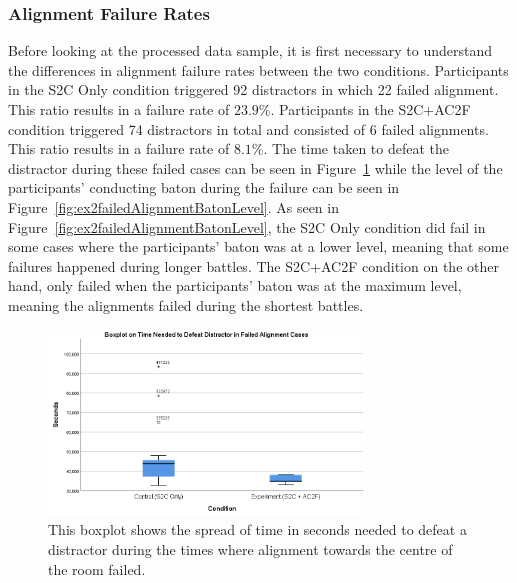 \subsubsection{Alignment Failure Rates}
Before looking at the processed data sample, it is first necessary to understand the differences in alignment failure rates between the two conditions. Participants in the S2C Only condition triggered 92 distractors in which 22 failed alignment. This ratio results in a failure rate of $23.9\%$. Participants in the S2C+AC2F condition triggered 74 distractors in total and consisted of 6 failed alignments. This ratio results in a failure rate of $8.1\%$. The time taken to defeat the distractor during these failed cases can be seen in Figure~\ref{fig:ex2failedDistractorTimeBoxplot} while the level of the participants' conducting baton during the failure can be seen in Figure~\ref{fig:ex2failedAlignmentBatonLevel}. As seen in Figure~\ref{fig:ex2failedAlignmentBatonLevel}, the S2C Only condition did fail in some cases where the participants' baton was at a lower level, meaning that some failures happened during longer battles. The S2C+AC2F condition on the other hand, only failed when the participants' baton was at the maximum level, meaning the alignments failed during the shortest battles. 

\begin{figure}[tbph]
    \centering
    \includegraphics[width=0.75\textwidth]{figures/graphs/failureDistractorDefeatTimeBoxplot.png}
    \caption[Boxplot of Time Needed to Defeat Distractor During Failed Alignments]{This boxplot shows the spread of time in seconds needed to defeat a distractor during the times where alignment towards the centre of the room failed.}
    \label{fig:ex2failedDistractorTimeBoxplot}
\end{figure}

